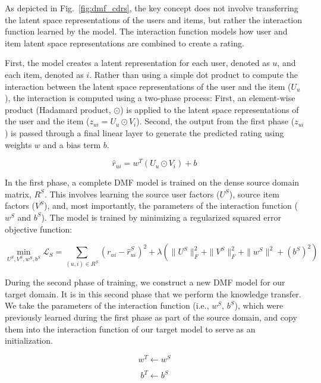 \documentclass[pdflatex,sn-mathphys-num]{sn-jnl}%
\theoremstyle{thmstyleone}%
\theoremstyle{thmstyletwo}%
\theoremstyle{thmstylethree}%
\begin{document}
As depicted in Fig.~\ref{fig:dmf_cdrs}, the key concept does not involve transferring the latent space representations of the users and items, but rather the interaction function learned by the model. The interaction function models how user and item latent space representations are combined to create a rating.

First, the model creates a latent representation for each user, denoted as $u$, and each item, denoted as $i$. Rather than using a simple dot product to compute the interaction between the latent space representations of the user and the item ($U_u$), the interaction is computed using a two-phase process: First, an element-wise product (Hadamard product, $\odot$) is applied to the latent space representations of the user and the item ($z_{ui} = U_u \odot V_i$). Second, the output from the first phase ($z_{ui}$) is passed through a final linear layer to generate the predicted rating using weights $w$ and a bias term $b$.

\begin{equation}
\hat{r}_{ui} = w^T (U_u \odot V_i) + b
\end{equation}

In the first phase, a complete DMF model is trained on the dense source domain matrix, $R^S$. This involves learning the source user factors ($U^S$), source item factors ($V^S$), and, most importantly, the parameters of the interaction function ($w^S$ and $b^S$). The model is trained by minimizing a regularized squared error objective function:

\begin{equation}
\min_{U^S, V^S, w^S, b^S} \mathcal{L}_S = \sum_{(u,i) \in R^S} (r_{ui} - \hat{r}_{ui}^S)^2 + \lambda (\|U^S\|_F^2 + \|V^S\|_F^2 + \|w^S\|^2 + (b^S)^2)
\end{equation}

During the second phase of training, we construct a new DMF model for our target domain. It is in this second phase that we perform the knowledge transfer. We take the parameters of the interaction function (i.e., $w^S$, $b^S$), which were previously learned during the first phase as part of the source domain, and copy them into the interaction function of our target model to serve as an initialization.

\begin{equation}
w^T \leftarrow w^S
\end{equation}

\begin{equation}
b^T \leftarrow b^S
\end{equation}
\end{document}
